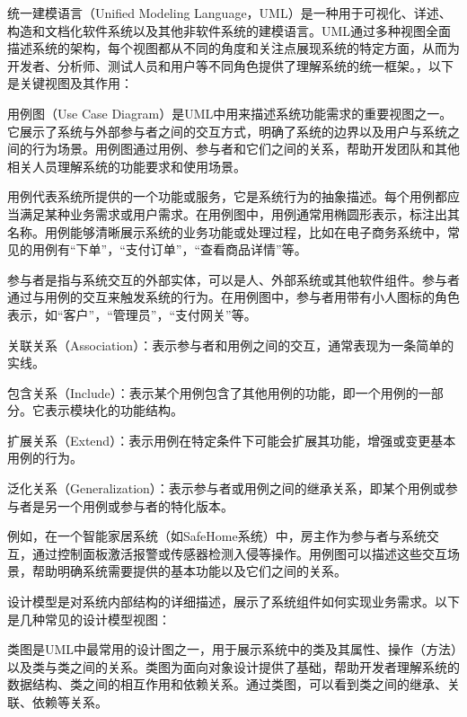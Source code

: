 统一建模语言（Unified Modeling Language，UML）是一种用于可视化、详述、构造和文档化软件系统以及其他非软件系统的建模语言。UML通过多种视图全面描述系统的架构，每个视图都从不同的角度和关注点展现系统的特定方面，从而为开发者、分析师、测试人员和用户等不同角色提供了理解系统的统一框架。，以下是关键视图及其作用：


用例图（Use Case Diagram）是UML中用来描述系统功能需求的重要视图之一。它展示了系统与外部参与者之间的交互方式，明确了系统的边界以及用户与系统之间的行为场景。用例图通过用例、参与者和它们之间的关系，帮助开发团队和其他相关人员理解系统的功能要求和使用场景。

用例代表系统所提供的一个功能或服务，它是系统行为的抽象描述。每个用例都应当满足某种业务需求或用户需求。在用例图中，用例通常用椭圆形表示，标注出其名称。用例能够清晰展示系统的业务功能或处理过程，比如在电子商务系统中，常见的用例有``下单''，``支付订单''，``查看商品详情''等。

参与者是指与系统交互的外部实体，可以是人、外部系统或其他软件组件。参与者通过与用例的交互来触发系统的行为。在用例图中，参与者用带有小人图标的角色表示，如``客户''，``管理员''，``支付网关''等。


关联关系（Association）：表示参与者和用例之间的交互，通常表现为一条简单的实线。

包含关系（Include）：表示某个用例包含了其他用例的功能，即一个用例的一部分。它表示模块化的功能结构。

扩展关系（Extend）：表示用例在特定条件下可能会扩展其功能，增强或变更基本用例的行为。

泛化关系（Generalization）：表示参与者或用例之间的继承关系，即某个用例或参与者是另一个用例或参与者的特化版本。

例如，在一个智能家居系统（如SafeHome系统）中，房主作为参与者与系统交互，通过控制面板激活报警或传感器检测入侵等操作。用例图可以描述这些交互场景，帮助明确系统需要提供的基本功能以及它们之间的关系。


设计模型是对系统内部结构的详细描述，展示了系统组件如何实现业务需求。以下是几种常见的设计模型视图：

类图是UML中最常用的设计图之一，用于展示系统中的类及其属性、操作（方法）以及类与类之间的关系。类图为面向对象设计提供了基础，帮助开发者理解系统的数据结构、类之间的相互作用和依赖关系。通过类图，可以看到类之间的继承、关联、依赖等关系。

